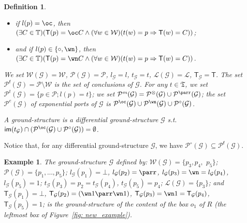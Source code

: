 \documentclass{article}
\newcommand{\lone}{1}
\newcommand{\lpar}{\parr}
\newcommand{\target}[1]{t_{#1}}
\theoremstyle{plain}
\newtheorem{definition}{Definition}
\newtheorem{example}{Example}
\newcommand{\leftwires}[1]{\mathcal{L}(#1)}
\newcommand{\labelofcell}[1]{l_{#1}}
\newcommand{\im}[1]{\textsf{im}(#1)}
\newcommand{\typesoflinks}{\mathfrak{T}}
\newcommand{\tens}{\otimes}
\newcommand{\one}{1}
\newcommand{\cod}{\oc}
\newcommand{\contr}{\wn}
\newcommand{\ports}[1]{\mathcal{P}(#1)}
\newcommand{\conclusions}[1]{\mathcal{P}^{\textsf{f}}(#1)}
\newcommand{\multiplicativeports}[1]{\mathcal{P}^\textit{m}(#1)}
\newcommand{\portsoftype}[2]{\mathcal{P}^{#1}(#2)}
\newcommand{\exponentialports}[1]{\mathcal{P}^{\textit{e}}(#1)}
\newcommand{\wires}[1]{\mathcal{W}(#1)}
\begin{document}
\begin{definition}
\begin{itemize}
\begin{itemize}
\item if $l(p) = \cod$, then $(\exists C \in \mathbb{T}) (\textsf{T}(p) = \cod C \wedge (\forall w \in \mathcal{W}) (t(w) = p \Rightarrow \textsf{T}(w) = C))$;
\item and if $l(p) \in \{ \circ, \contr \}$, then $(\exists C \in \mathbb{T}) (\textsf{T}(p) = \contr C \wedge (\forall w \in \mathcal{W}) (t(w) = p \Rightarrow \textsf{T}(w) = C))$.
\end{itemize}
\end{itemize}
We set $\wires{\mathcal{G}} = \mathcal{W}$, $\ports{\mathcal{G}} = \mathcal{P}$, $\labelofcell{\mathcal{G}} = l$, $\target{\mathcal{G}} = t$, $\leftwires{\mathcal{G}} = \mathcal{L}$, $\textsf{T}_{\mathcal{G}} = \textsf{T}$. The set $\conclusions{\mathcal{G}} = \mathcal{P} \setminus \mathcal{W}$ is the set of \emph{conclusions of $\mathcal{G}$}. For any $t \in \typesoflinks$, we set $\portsoftype{t}{\mathcal{G}} = \{ p \in \mathcal{P}; l(p) = t \}$; we set $\multiplicativeports{\mathcal{G}} = \portsoftype{\tens}{\mathcal{G}} \cup \portsoftype{\parr}{\mathcal{G}}$; the set $\exponentialports{\mathcal{G}}$ of \emph{exponential ports of $\mathcal{G}$} is $\portsoftype{\cod}{\mathcal{G}} \cup \portsoftype{\contr}{\mathcal{G}} \cup \portsoftype{\circ}{\mathcal{G}}$. 

A \emph{ground-structure} is a differential ground-structure $\mathcal{G}$ s.t. $\im{\target{\mathcal{G}}} \cap (\portsoftype{\cod}{\mathcal{G}} \cup \portsoftype{\circ}{\mathcal{G}}) = \emptyset$.
\end{definition}

Notice that, for any differential ground-structure $\mathcal{G}$, we have $\portsoftype{\circ}{\mathcal{G}} \subseteq \conclusions{\mathcal{G}}$.

\begin{example}
The ground-structure $\mathcal{G}$ defined by: 
$\wires{\mathcal{G}} = \{ p_3, p_4,$ $p_5 \}$; 
$\ports{\mathcal{G}} = \{ p_1, \ldots, p_5 \}$; 
$\labelofcell{\mathcal{G}}(p_1) = \bot$, $\labelofcell{\mathcal{G}}(p_2) = \lpar$, $\labelofcell{\mathcal{G}}(p_3) = \contr = \labelofcell{\mathcal{G}}(p_4)$, $\labelofcell{\mathcal{G}}(p_5) = \lone$; 
$\target{\mathcal{G}}(p_3) = p_2 = \target{\mathcal{G}}(p_4)$, $\target{\mathcal{G}}(p_5) = p_4$; 
$\leftwires{\mathcal{G}} = \{ p_3 \}$; 
and $\textsf{T}_{\mathcal{G}}(p_1) = \bot$, $\textsf{T}_{\mathcal{G}}(p_2) = (\contr 1 \lpar \contr 1)$, $\textsf{T}_{\mathcal{G}}(p_3) = \contr 1 = \textsf{T}_{\mathcal{G}}(p_4)$, $\textsf{T}_{\mathcal{G}}(p_5) =  \one$; 
is the ground-structure of the content of the box $o_1$ of $R$ (the leftmost box of Figure~\ref{fig: new_example}).
\end{example}
\end{document}
